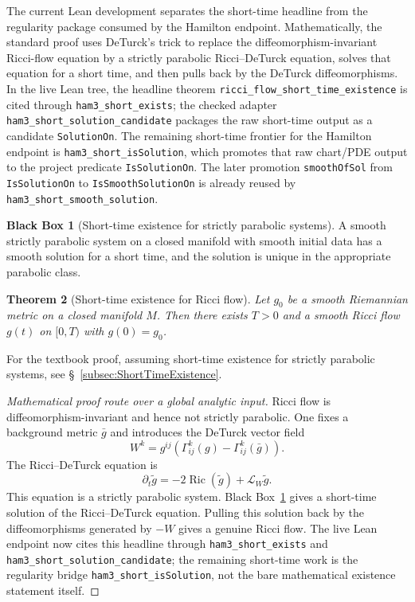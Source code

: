 \documentclass[11pt]{article}
\theoremstyle{plain}
\newtheorem{theorem}{Theorem}[section]
\theoremstyle{definition}
\newtheorem{blackbox}[theorem]{Black Box}
\theoremstyle{remark}
\newcommand{\Ric}{\operatorname{Ric}}
\newcommand{\Lie}{\mathcal L}
\newcommand{\leanref}[1]{\nolinkurl{#1}}
\begin{document}
The current Lean development separates the short-time headline from the
regularity package consumed by the Hamilton endpoint.  Mathematically, the
standard proof uses DeTurck's trick to replace the diffeomorphism-invariant
Ricci-flow equation by a strictly parabolic Ricci--DeTurck equation, solves
that equation for a short time, and then pulls back by the DeTurck
diffeomorphisms.  In the live Lean tree, the headline theorem
\leanref{ricci_flow_short_time_existence} is cited through
\leanref{ham3_short_exists}; the checked adapter
\leanref{ham3_short_solution_candidate} packages the raw short-time output as a
candidate \leanref{SolutionOn}.  The remaining short-time frontier for the
Hamilton endpoint is \leanref{ham3_short_isSolution}, which promotes that raw
chart/PDE output to the project predicate \leanref{IsSolutionOn}.  The later
promotion \leanref{smoothOfSol} from \leanref{IsSolutionOn} to
\leanref{IsSmoothSolutionOn} is already reused by
\leanref{ham3_short_smooth_solution}.

\begin{blackbox}[Short-time existence for strictly parabolic systems]
\label{bb:strictly-parabolic-short-time}
A smooth strictly parabolic system on a closed manifold with smooth initial data
has a smooth solution for a short time, and the solution is unique in the
appropriate parabolic class.
\end{blackbox}

\begin{theorem}[Short-time existence for Ricci flow]
\label{thm:rf-short-time-existence}
Let $g_0$ be a smooth Riemannian metric on a closed manifold $M$. Then there
exists $T>0$ and a smooth Ricci flow $g(t)$ on $[0,T)$ with $g(0)=g_0$.
\end{theorem}

For the textbook proof, assuming short-time existence for strictly parabolic
systems, see \S\ \ref{subsec:ShortTimeExistence}.

\begin{proof}[Mathematical proof route over a global analytic input]
Ricci flow is diffeomorphism-invariant and hence not strictly parabolic.  One
fixes a background metric $\bar g$ and introduces the DeTurck vector field
\[
W^k
=
g^{ij}\left(\Gamma^k_{ij}(g)-\Gamma^k_{ij}(\bar g)\right).
\]
The Ricci--DeTurck equation is
\[
\partial_t\tilde g
=
-2\Ric(\tilde g)+\Lie_W\tilde g.
\]
This equation is a strictly parabolic system.  Black
Box~\ref{bb:strictly-parabolic-short-time} gives a short-time solution of the
Ricci--DeTurck equation.  Pulling this solution back by the diffeomorphisms
generated by $-W$ gives a genuine Ricci flow.  The live Lean endpoint now cites
this headline through \leanref{ham3_short_exists} and
\leanref{ham3_short_solution_candidate}; the remaining short-time work is the
regularity bridge \leanref{ham3_short_isSolution}, not the bare mathematical
existence statement itself.
\end{proof}
\end{document}
